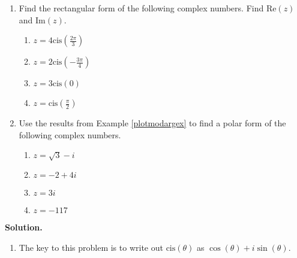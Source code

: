 \begin{ex} \label{polarcomplexex} $~$

\begin{enumerate}

\item Find the rectangular form of the following complex numbers. Find $\text{Re}(z)$ and $\text{Im}(z)$.

\begin{multicols}{4}

\begin{enumerate}

\item  $z = 4 \text{cis}\left(\frac{2\pi}{3}\right)$

\item  $z = 2 \text{cis}\left(-\frac{3\pi}{4}\right)$

\item  $z = 3 \text{cis}(0)$

\item  $z = \text{cis}\left(\frac{\pi}{2}\right)$

\end{enumerate}

\end{multicols}

\item  Use the results from Example \ref{plotmodargex} to find a polar form of the following complex numbers.

\begin{multicols}{4}

\begin{enumerate}

\item  $z = \sqrt{3}-i$

\item  $z = -2+4i$

\item  $z = 3i$

\item  $z = -117$

\end{enumerate}

\end{multicols}



\end{enumerate}


{\bf Solution.} 

\begin{enumerate}


\item The key to this problem is to write out $\text{cis}(\theta)$ as $\cos(\theta) + i\sin(\theta)$.


\end{enumerate}
\end{ex}
